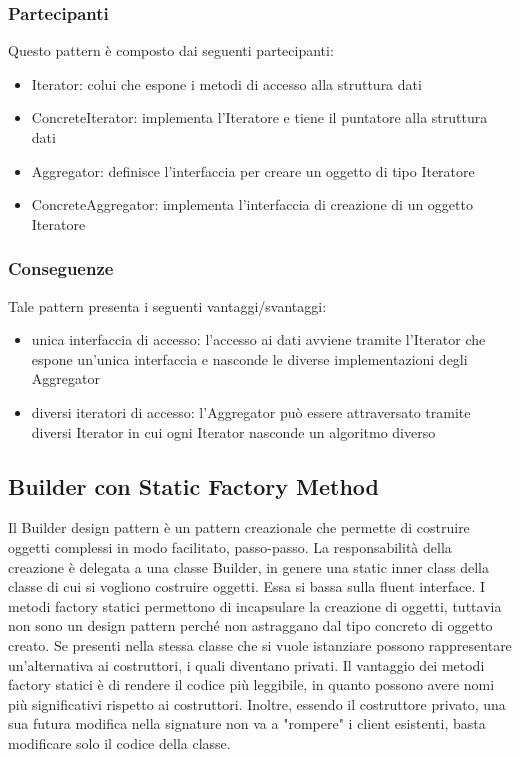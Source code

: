 \documentclass{article}
\begin{document}
\subsubsection{Partecipanti}
Questo pattern è composto dai seguenti partecipanti:
\begin{itemize}
    \item Iterator: colui che espone i metodi di accesso alla struttura dati
    \item ConcreteIterator: implementa l’Iteratore e tiene il puntatore alla struttura dati
    \item Aggregator: definisce l’interfaccia per creare un oggetto di tipo Iteratore
    \item ConcreteAggregator: implementa l’interfaccia di creazione di un oggetto Iteratore
\end{itemize}
\subsubsection{Conseguenze}
Tale pattern presenta i seguenti vantaggi/svantaggi:
\begin{itemize}
  \item unica interfaccia di accesso: l’accesso ai dati avviene tramite l’Iterator che espone un’unica interfaccia e nasconde le diverse implementazioni degli Aggregator
  \item diversi iteratori di accesso: l’Aggregator può essere attraversato tramite diversi Iterator in cui ogni Iterator nasconde un algoritmo diverso
\end{itemize}

\subsection{Builder con Static Factory Method}
Il Builder design pattern è un pattern creazionale che permette di costruire oggetti complessi in modo facilitato, passo-passo. La responsabilità della creazione è delegata a una classe Builder, in genere una static inner class della classe di cui si vogliono costruire oggetti. Essa si bassa sulla fluent interface.
I metodi factory statici permettono di incapsulare la creazione di oggetti, tuttavia non sono un design pattern perché non astraggano dal tipo concreto di oggetto creato. Se presenti nella stessa classe che si vuole istanziare possono rappresentare un'alternativa ai costruttori, i quali diventano privati. Il vantaggio dei metodi factory statici è di rendere il codice più leggibile, in quanto possono avere nomi più significativi rispetto ai costruttori. Inoltre, essendo il costruttore privato, una sua futura modifica nella signature non va a "rompere" i client esistenti, basta modificare solo il codice della classe.  
\end{document}

